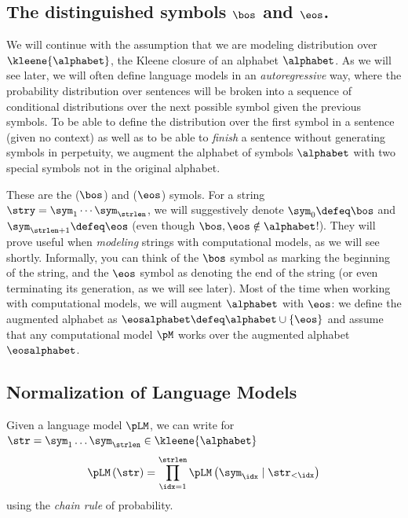 \subsection{The distinguished symbols $\bos$ and $\eos$.}

We will continue with the assumption that we are modeling distribution over $\kleene{\alphabet}$, the Kleene closure of an alphabet $\alphabet$.
As we will see later, we will often define language models in an \emph{autoregressive} way, where the probability distribution over sentences will be broken into a sequence of conditional distributions over the next possible symbol given the previous symbols.
To be able to define the distribution over the first symbol in a sentence (given no context) as well as to be able to \emph{finish} a sentence without generating symbols in perpetuity, we augment the alphabet of symbols $\alphabet$ with two special symbols not in the original alphabet.

These are the  ($\bos$) and  ($\eos$) symols.
For a string $\stry = \sym_1 \cdots \sym_\strlen$, we will suggestively denote $\sym_{0} \defeq \bos$ and $\sym_{\strlen + 1} \defeq \eos$ (even though $\bos, \eos \notin \alphabet$!).
They will prove useful when \emph{modeling} strings with computational models, as we will see shortly.
Informally, you can think of the $\bos$ symbol as marking the beginning of the string, and the $\eos$ symbol as denoting the end of the string (or even terminating its generation, as we will see later).
Most of the time when working with computational models, we will augment $\alphabet$ with $\eos$: we define the augmented alphabet as $\eosalphabet \defeq \alphabet \cup \{\eos\}$ and assume that any computational model $\pM$ works over the augmented alphabet $\eosalphabet$. 

\subsection{Normalization of Language Models}

Given a language model $\pLM$, we can write for $\str = \sym_1 \ldots \sym_\strlen \in \kleene{\alphabet}$
\begin{equation}
    \pLM\left(\str\right) = \prod_{\idx = 1}^{\strlen}\pLM\left(\sym_\idx \mid \str_{<\idx}\right)
\end{equation}
using the \emph{chain rule} of probability.

